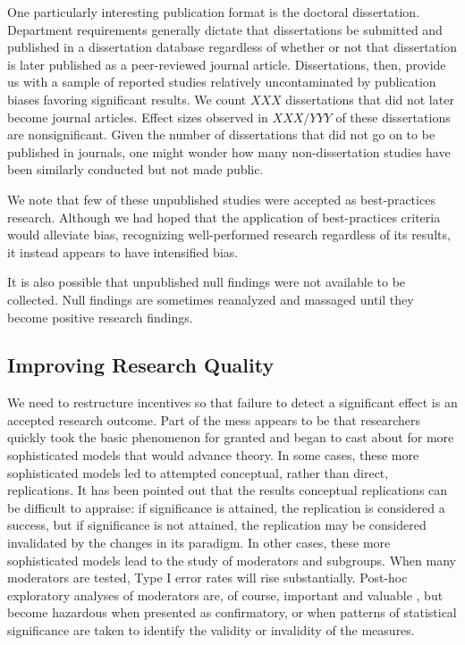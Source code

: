 \documentclass[man]{apa6}
\begin{document}
One particularly interesting publication format is the doctoral dissertation. Department requirements generally dictate that dissertations be submitted and published in a dissertation database regardless of whether or not that dissertation is later published as a peer-reviewed journal article. Dissertations, then, provide us with a sample of reported studies relatively uncontaminated by publication biases favoring significant results. We count $XXX$ dissertations that did not later become journal articles. Effect sizes observed in $XXX/YYY$ of these dissertations are nonsignificant. Given the number of dissertations that did not go on to be published in journals, one might wonder how many non-dissertation studies have been similarly conducted but not made public. 

We note that few of these unpublished studies were accepted as best-practices research. Although we had hoped that the application of best-practices criteria would alleviate bias, recognizing well-performed research regardless of its results, it instead appears to have intensified bias. 

It is also possible that unpublished null findings were not available to be collected. Null findings are sometimes reanalyzed and massaged until they become positive research findings.



\subsection{Improving Research Quality}
We need to restructure incentives so that failure to detect a significant effect is an accepted research outcome. %
Part of the mess appears to be that researchers quickly took the basic phenomenon for granted and began to cast about for more sophisticated models that would advance theory. In some cases, these more sophisticated models led to attempted conceptual, rather than direct, replications. It has been pointed out that the results conceptual replications can be difficult to appraise: if significance is attained, the replication is considered a success, but if significance is not attained, the replication may be considered invalidated by the changes in its paradigm. In other cases, these more sophisticated models lead to the study of moderators and subgroups. When many moderators are tested, Type I error rates will rise substantially. Post-hoc exploratory analyses of moderators are, of course, important and valuable \citep[indeed, we present them ourselves in][]{Engelhardt:etal:2014}, but become hazardous when presented as confirmatory, or when patterns of statistical significance are taken to identify the validity or invalidity of the measures.
\end{document}

